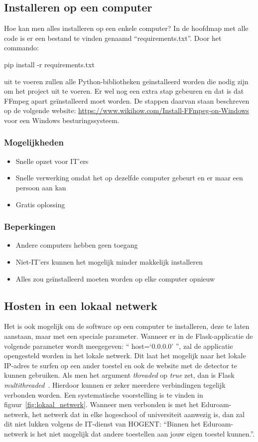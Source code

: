 \subsection{Installeren op een computer}
Hoe kan men alles installeren op een enkele computer?
In de hoofdmap met alle code is er een bestand te vinden genaamd ``requirements.txt''. Door het commando:
\begin{python}
    pip install -r requirements.txt
\end{python}
uit te voeren zullen alle Python-bibliotheken geïnstalleerd worden die nodig zijn om het project uit te voeren. Er wel nog een extra stap gebeuren en dat is dat FFmpeg apart geïnstalleerd moet worden. De stappen daarvan staan beschreven op de volgende website: \url{https://www.wikihow.com/Install-FFmpeg-on-Windows} voor een Windows besturingssysteem.

\subsubsection{Mogelijkheden}
\begin{itemize}
    \item Snelle opzet voor IT'ers
    \item Snelle verwerking omdat het op dezelfde computer gebeurt en er maar een persoon aan kan
    \item Gratis oplossing
\end{itemize}
\subsubsection{Beperkingen}
\begin{itemize}
    \item Andere computers hebben geen toegang
    \item Niet-IT'ers kunnen het mogelijk minder makkelijk installeren
    \item Alles zou geïnstalleerd moeten worden op elke computer opnieuw
\end{itemize}

\subsection{Hosten in een lokaal netwerk}
Het is ook mogelijk om de software op een computer te installeren, deze te laten aanstaan, maar met een speciale parameter. Wanneer er in de Flask-applicatie de volgende parameter wordt meegegeven: `` host=`0.0.0.0' '', zal de applicatie opengesteld worden in het lokale netwerk. Dit laat het mogelijk naar het lokale IP-adres te surfen op een ander toestel en ook de website met de detector te kunnen gebruiken. Als men het argument \textit{threaded} op \textit{true} zet, dan is Flask \textit{multithreaded}~\autocite{Vieira2013}. Hierdoor kunnen er zeker meerdere verbindingen tegelijk verbonden worden. Een systematische voorstelling is te vinden in figuur~\ref{fig:lokaal_netwerk}. Wanneer men verbonden is met het Eduroam-netwerk, het netwerk dat in elke hogeschool of universiteit aanwezig is, dan zal dit niet lukken volgens de IT-dienst van HOGENT: ``Binnen het Eduroam-netwerk is het niet mogelijk dat andere toestellen aan jouw eigen toestel kunnen.''.

